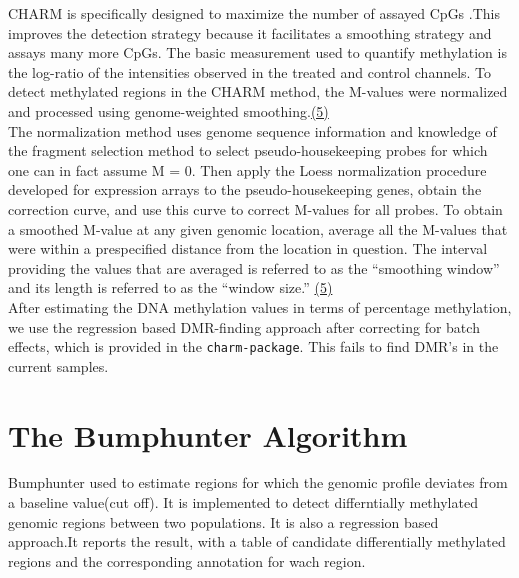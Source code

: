 \documentclass[11pt]{article}
\begin{document}
CHARM is specifically designed to maximize the number of assayed CpGs .This improves the detection strategy because it facilitates a smoothing strategy and assays many more CpGs.  The basic measurement used to quantify methylation is the log-ratio of the intensities observed in the treated and control channels. To detect methylated regions in the CHARM method, the M-values were normalized and processed using genome-weighted smoothing.\href{http://www.ncbi.nlm.nih.gov/pmc/articles/PMC2336799/}{(5)}\\

The normalization method uses genome sequence information and knowledge of the fragment selection method to select pseudo-housekeeping probes for which one can in fact assume M = 0. Then apply the Loess normalization procedure developed for expression arrays to the pseudo-housekeeping genes, obtain the correction curve, and use this curve to correct M-values for all probes. To obtain a smoothed M-value at any given genomic location, average all the M-values that were within a prespecified distance from the location in question. The interval providing the values that are averaged is referred to as the “smoothing window” and its length is referred to as the “window size.” \href{http://www.ncbi.nlm.nih.gov/pmc/articles/PMC2336799/}{(5)} \\

After estimating the DNA methylation values in terms of percentage methylation, we use the regression based DMR-finding approach after correcting for batch effects, which is provided in the {\tt charm-package}. This fails to find DMR’s in the current samples.


\section*{The Bumphunter Algorithm}


Bumphunter used to estimate regions for which the genomic profile deviates from a baseline value(cut off). It is implemented to detect differntially methylated genomic regions between two populations. It is also a regression based approach.It reports the result, with a table of candidate differentially methylated regions and the corresponding annotation for wach region.
\end{document}
